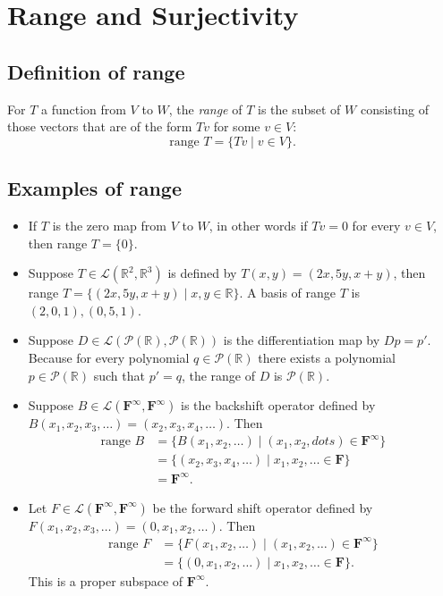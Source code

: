 \documentclass[11pt]{article}
\begin{document}
    \section{Range and Surjectivity}

    \subsection{Definition of range}

    For $T$ a function from $V$ to $W$, the \emph{range} of $T$ is the subset of $W$ consisting of those vectors that are of the form $Tv$ for some $v \in V$: \[ \text{range } T = \{Tv \mid v \in V\}. \]

    \subsection{Examples of range}

    \begin{itemize}
        \item If $T$ is the zero map from $V$ to $W$, in other words if $Tv = 0$ for every $v \in V$, then range $T = \{0\}$.
        \item Suppose \(T \in \mathcal{L}(\mathbb{R}^2, \mathbb{R}^3)\) is defined by \(T(x,y) = (2x, 5y, x + y)\), then range $T = \{(2x, 5y, x+y) \mid x,y \in \mathbb{R}\}$. A basis of range $T$ is \((2,0,1),(0,5,1)\). 
        \item Suppose \(D \in \mathcal{L}(\mathcal{P}(\mathbb{R}), \mathcal{P}(\mathbb{R}))\) is the differentiation map by \(Dp = p'\). Because for every polynomial \(q \in \mathcal{P}(\mathbb{R})\) there exists a polynomial \(p \in \mathcal{P}(\mathbb{R})\) such that \(p' = q\), the range of $D$ is \(\mathcal{P}(\mathbb{R})\). 
        \item Suppose \(B \in \mathcal{L}(\textbf{F}^{\infty}, \textbf{F}^{\infty})\) is the backshift operator defined by \(B(x_1, x_2, x_3, \dots) = (x_2, x_3, x_4, \dots)\). Then
        \begin{align*}
            \text{range } B &= \{B(x_1, x_2, \dots) \mid (x_1, x_2, dots) \in \textbf{F}^{\infty}\} \\
            &= \{(x_2, x_3, x_4, \dots) \mid x_1, x_2, \dots \in \textbf{F}\} \\
            &= \textbf{F}^{\infty}.
        \end{align*}
        \item Let \(F \in \mathcal{L}(\textbf{F}^{\infty}, \textbf{F}^{\infty})\) be the forward shift operator defined by \(F(x_1, x_2, x_3, \dots) = (0, x_1, x_2, \dots)\). Then 
        \begin{align*}
            \text{range } F &= \{F(x_1, x_2, \dots) \mid (x_1, x_2, \dots) \in \textbf{F}^{\infty}\} \\
            &= \{(0, x_1, x_2, \dots) \mid x_1, x_2, \dots \in \textbf{F}\}.
        \end{align*}
        This is a proper subspace of \(\textbf{F}^{\infty}\). 
    \end{itemize}
\end{document}
